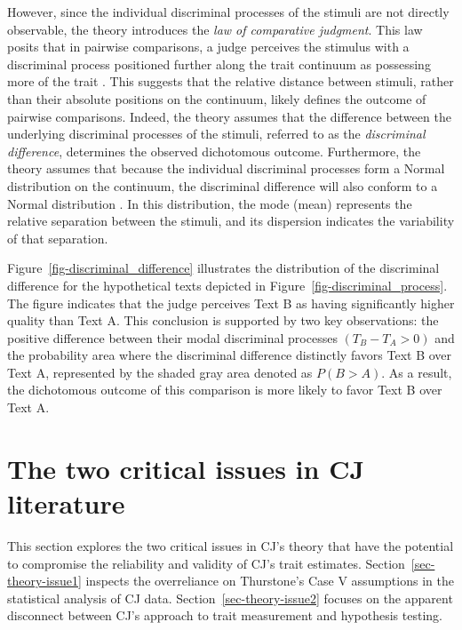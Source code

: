 \documentclass[
  authoryear,
  review,
  1p]{elsarticle}
\begin{document}
However, since the individual discriminal processes of the stimuli are
not directly observable, the theory introduces the \emph{law of
comparative judgment}. This law posits that in pairwise comparisons, a
judge perceives the stimulus with a discriminal process positioned
further along the trait continuum as possessing more of the trait
\citep[pp.~251]{Bramley_2008}. This suggests that the relative distance
between stimuli, rather than their absolute positions on the continuum,
likely defines the outcome of pairwise comparisons. Indeed, the theory
assumes that the difference between the underlying discriminal processes
of the stimuli, referred to as the \emph{discriminal difference},
determines the observed dichotomous outcome. Furthermore, the theory
assumes that because the individual discriminal processes form a Normal
distribution on the continuum, the discriminal difference will also
conform to a Normal distribution \citep{Andrich_1978}. In this
distribution, the mode (mean) represents the relative separation between
the stimuli, and its dispersion indicates the variability of that
separation.

Figure~\ref{fig-discriminal_difference} illustrates the distribution of
the discriminal difference for the hypothetical texts depicted in
Figure~\ref{fig-discriminal_process}. The figure indicates that the
judge perceives Text B as having significantly higher quality than Text
A. This conclusion is supported by two key observations: the positive
difference between their modal discriminal processes
\((T_{B} - T_{A} > 0)\) and the probability area where the discriminal
difference distinctly favors Text B over Text A, represented by the
shaded gray area denoted as \(P(B > A)\). As a result, the dichotomous
outcome of this comparison is more likely to favor Text B over Text A.

\section{The two critical issues in CJ
literature}\label{sec-theory-issues}

This section explores the two critical issues in CJ's theory that have
the potential to compromise the reliability and validity of CJ's trait
estimates. Section~\ref{sec-theory-issue1} inspects the overreliance on
Thurstone's Case V assumptions in the statistical analysis of CJ data.
Section~\ref{sec-theory-issue2} focuses on the apparent disconnect
between CJ's approach to trait measurement and hypothesis testing.
\end{document}
